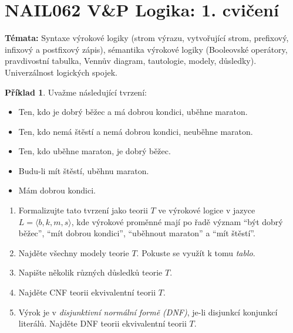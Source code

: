 \documentclass[a4paper]{article}
\theoremstyle{definition}
\newtheorem{problem}{Příklad}
\begin{document}
\section*{NAIL062 V\&P Logika: 1. cvičení}


\textbf{Témata:} 
Syntaxe výrokové logiky (strom výrazu, vytvořující strom, prefixový, infixový a postfixový zápis), sémantika výrokové logiky (Booleovské operátory, pravdivostní tabulka, Vennův diagram, tautologie, modely, důsledky). Univerzálnost logických spojek.


\medskip\begin{problem}
Uvažme následující tvrzení:
\begin{itemize}\it
\item Ten, kdo je dobrý běžec a má dobrou kondici, uběhne maraton.
\item Ten, kdo nemá štěstí a nemá dobrou kondici, neuběhne maraton.
\item Ten, kdo uběhne maraton, je dobrý běžec.
\item Budu-li mít štěstí, uběhnu maraton.
\item Mám dobrou kondici.
\end{itemize}
\begin{enumerate}
\item Formalizujte tato tvrzení jako teorii $T$ ve výrokové logice v jazyce $L=\langle b, k, m, s\rangle$, kde výrokové proměnné mají po řadě význam ``být dobrý běžec'', ``mít dobrou kondici'', ``uběhnout maraton'' a ``mít štěstí''.
\item Najděte všechny modely teorie $T$. Pokuste se využít k tomu \emph{tablo}.
\item Napište několik různých důsledků teorie $T$.
\item Najděte CNF teorii ekvivalentní teorii $T$.
\item Výrok je v \emph{disjunktivní normální formě (DNF)}, je-li disjunkcí konjunkcí literálů. Najděte DNF teorii ekvivalentní teorii $T$. 
\end{enumerate}
\end{problem}
\end{document}
